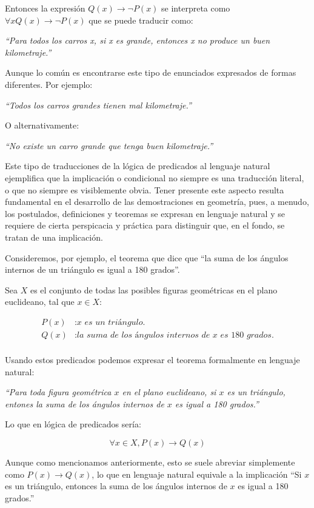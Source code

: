 Entonces la expresión $Q(x) \rightarrow \neg P(x)$ se interpreta como $\forall{x}Q(x) \rightarrow \neg P(x)$ que se puede traducir como:

\textit{``Para todos los carros x, si x es grande, entonces x no produce un buen kilometraje.''}

Aunque lo común es encontrarse este tipo de enunciados expresados de formas diferentes. Por ejemplo:

\textit{``Todos los carros grandes tienen mal kilometraje.''}

O alternativamente:

\textit{``No existe un carro grande que tenga buen kilometraje.''}

Este tipo de traducciones de la lógica de predicados al lenguaje natural ejemplifica que la implicación o condicional no siempre es una traducción literal, o que no siempre es visiblemente obvia. Tener presente este aspecto resulta fundamental en el desarrollo de las demostraciones en geometría, pues, a menudo, los postulados, definiciones y teoremas se expresan en lenguaje natural y se requiere de cierta perspicacia y práctica para distinguir que, en el fondo, se tratan de una implicación.

Consideremos, por ejemplo, el teorema que dice que ``la suma de los ángulos internos de un triángulo es igual a 180 grados''.  

Sea $X$ es el conjunto de todas las posibles figuras geométricas en el plano euclideano, tal que $x \in X$:

\begin{equation*}
    \begin{split}
        P(x) &: \textit{x es un triángulo.} \\
        Q(x) &: \textit{la suma de los ángulos internos de x es 180 grados.} \\
    \end{split}
\end{equation*}

Usando estos predicados podemos expresar el teorema formalmente en lenguaje natural:

\textit{``Para toda figura geométrica $x$ en el plano euclideano, si $x$ es un triángulo, entones la suma de los ángulos internos de $x$ es igual a 180 grados.''}

Lo que en lógica de predicados sería:

$$\forall{x \in X}, P(x) \rightarrow Q(x)$$ 

Aunque como mencionamos anteriormente, esto se suele abreviar simplemente como $P(x) \rightarrow Q(x)$, lo que en lenguaje natural equivale a la implicación ``Si $x$ es un triángulo, entonces la suma de los ángulos internos de $x$ es igual a 180 grados.''

